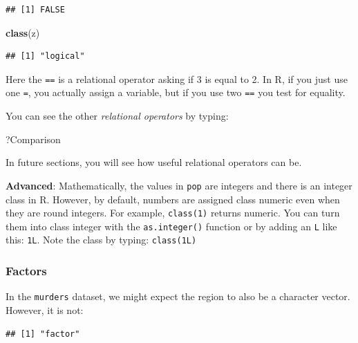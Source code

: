 \documentclass[
]{article}
\newenvironment{Shaded}{\begin{snugshade}}{\end{snugshade}}
\newcommand{\FunctionTok}[1]{\textcolor[rgb]{0.13,0.29,0.53}{\textbf{#1}}}
\newcommand{\NormalTok}[1]{#1}
\newcommand{\SpecialCharTok}[1]{\textcolor[rgb]{0.81,0.36,0.00}{\textbf{#1}}}
\begin{document}
\begin{verbatim}
## [1] FALSE
\end{verbatim}

\begin{Shaded}
\begin{Highlighting}[]
\FunctionTok{class}\NormalTok{(z)}
\end{Highlighting}
\end{Shaded}

\begin{verbatim}
## [1] "logical"
\end{verbatim}

Here the \texttt{==} is a relational operator asking if 3 is equal to 2.
In R, if you just use one \texttt{=}, you actually assign a variable,
but if you use two \texttt{==} you test for equality.

You can see the other \emph{relational operators} by typing:

\begin{Shaded}
\begin{Highlighting}[]
\NormalTok{?Comparison}
\end{Highlighting}
\end{Shaded}

In future sections, you will see how useful relational operators can be.

\textbf{Advanced}: Mathematically, the values in \texttt{pop} are
integers and there is an integer class in R. However, by default,
numbers are assigned class numeric even when they are round integers.
For example, \texttt{class(1)} returns numeric. You can turn them into
class integer with the \texttt{as.integer()} function or by adding an
\texttt{L} like this: \texttt{1L}. Note the class by typing:
\texttt{class(1L)}

\subsubsection{Factors}\label{factors}

In the \texttt{murders} dataset, we might expect the region to also be a
character vector. However, it is not:

\begin{Shaded}
\end{Shaded}

\begin{verbatim}
## [1] "factor"
\end{verbatim}
\end{document}
